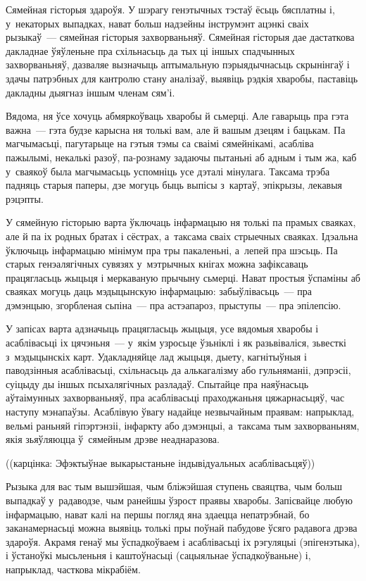 Сямейная гісторыя здароўя. У шэрагу генэтычных тэстаў ёсьць бясплатны і, у~некаторых выпадках, нават больш надзейны інструмэнт ацэнкі сваіх рызыкаў~--- сямейная гісторыя захворваньняў. Сямейная гісторыя дае дастаткова дакладнае ўяўленьне пра схільнасьць да тых ці іншых спадчынных захворваньняў, дазваляе вызначыць аптымальную пэрыядычнасьць скрынінгаў і здачы патрэбных для кантролю стану аналізаў, выявіць рэдкія хваробы, паставіць дакладны дыягназ іншым членам сям'і.

Вядома, ня ўсе хочуць абмяркоўваць хваробы й сьмерці. Але гаварыць пра гэта важна~--- гэта будзе карысна ня толькі вам, але й вашым дзецям і бацькам. Па магчымасьці, пагутарыце на гэтыя тэмы са сваімі сямейнікамі, асабліва пажылымі, некалькі разоў, па-рознаму задаючы пытаньні аб адным і тым жа, каб у~сваякоў была магчымасьць успомніць усе дэталі мінулага. Таксама трэба падняць старыя паперы, дзе могуць быць выпісы з~картаў, эпікрызы, лекавыя рэцэпты.

У сямейную гісторыю варта ўключаць інфармацыю ня толькі па прамых сваяках, але й па іх родных братах і сёстрах, а~таксама сваіх стрыечных сваяках. Ідэальна ўключыць інфармацыю мінімум пра тры пакаленьні, а~лепей пра шэсьць. Па старых генэалягічных сувязях у~мэтрычных кнігах можна зафіксаваць працягласьць жыцьця і меркаваную прычыну сьмерці. Нават простыя ўспаміны аб сваяках могуць даць мэдыцынскую інфармацыю: забыўлівасьць~--- пра дэмэнцыю, згорбленая сьпіна~--- пра астэапароз, прыступы~--- пра эпілепсію.

У запісах варта адзначыць працягласьць жыцьця, усе вядомыя хваробы і асаблівасьці іх цячэньня~--- у~якім узросьце ўзьніклі і як разьвіваліся, зьвесткі з~мэдыцынскіх карт. Удакладняйце лад жыцьця, дыету, кагнітыўныя і паводзінныя асаблівасьці, схільнасьць да алькагалізму або гульняманіі, дэпрэсіі, суіцыду ды іншых псыхалягічных разладаў. Спытайце пра наяўнасьць аўтаімунных захворваньняў, пра асаблівасьці праходжаньня цяжарнасьцяў, час наступу мэнапаўзы. Асаблівую ўвагу надайце незвычайным праявам: напрыклад, вельмі раньняй гіпэртэнзіі, інфаркту або дэмэнцыі, а~таксама тым захворваньням, якія зьяўляюцца ў~сямейным дрэве неаднаразова.

((карцінка: Эфэктыўнае выкарыстаньне індывідуальных асаблівасьцяў))

Рызыка для вас тым вышэйшая, чым бліжэйшая ступень сваяцтва, чым больш выпадкаў у~радаводзе, чым ранейшы ўзрост праявы хваробы. Запісвайце любую інфармацыю, нават калі на першы погляд яна здаецца непатрэбнай, бо заканамернасьці можна выявіць толькі пры поўнай пабудове ўсяго радавога дрэва здароўя. Акрамя генаў мы ўспадкоўваем і асаблівасьці іх рэгуляцыі (эпігенэтыка), і ўстаноўкі мысьленьня і каштоўнасьці (сацыяльнае ўспадкоўваньне) і, напрыклад, часткова мікрабіём.

